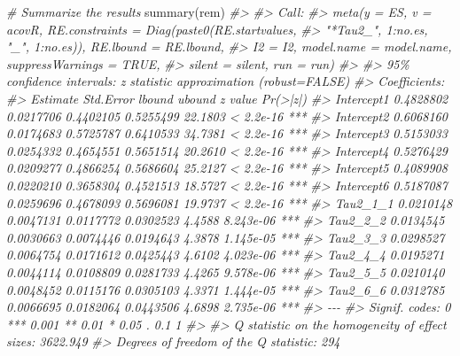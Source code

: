 \documentclass[
]{book}
\newenvironment{Shaded}{\begin{snugshade}}{\end{snugshade}}
\newcommand{\CommentTok}[1]{\textcolor[rgb]{0.56,0.35,0.01}{\textit{#1}}}
\newcommand{\FunctionTok}[1]{\textcolor[rgb]{0.00,0.00,0.00}{#1}}
\newcommand{\NormalTok}[1]{#1}
\begin{document}
\begin{Shaded}
\begin{Highlighting}[]
\CommentTok{\# Summarize the results}
\FunctionTok{summary}\NormalTok{(rem)}
\CommentTok{\#\textgreater{} }
\CommentTok{\#\textgreater{} Call:}
\CommentTok{\#\textgreater{} meta(y = ES, v = acovR, RE.constraints = Diag(paste0(RE.startvalues, }
\CommentTok{\#\textgreater{}     "*Tau2\_", 1:no.es, "\_", 1:no.es)), RE.lbound = RE.lbound, }
\CommentTok{\#\textgreater{}     I2 = I2, model.name = model.name, suppressWarnings = TRUE, }
\CommentTok{\#\textgreater{}     silent = silent, run = run)}
\CommentTok{\#\textgreater{} }
\CommentTok{\#\textgreater{} 95\% confidence intervals: z statistic approximation (robust=FALSE)}
\CommentTok{\#\textgreater{} Coefficients:}
\CommentTok{\#\textgreater{}             Estimate Std.Error    lbound    ubound z value  Pr(\textgreater{}|z|)    }
\CommentTok{\#\textgreater{} Intercept1 0.4828802 0.0217706 0.4402105 0.5255499 22.1803 \textless{} 2.2e{-}16 ***}
\CommentTok{\#\textgreater{} Intercept2 0.6068160 0.0174683 0.5725787 0.6410533 34.7381 \textless{} 2.2e{-}16 ***}
\CommentTok{\#\textgreater{} Intercept3 0.5153033 0.0254332 0.4654551 0.5651514 20.2610 \textless{} 2.2e{-}16 ***}
\CommentTok{\#\textgreater{} Intercept4 0.5276429 0.0209277 0.4866254 0.5686604 25.2127 \textless{} 2.2e{-}16 ***}
\CommentTok{\#\textgreater{} Intercept5 0.4089908 0.0220210 0.3658304 0.4521513 18.5727 \textless{} 2.2e{-}16 ***}
\CommentTok{\#\textgreater{} Intercept6 0.5187087 0.0259696 0.4678093 0.5696081 19.9737 \textless{} 2.2e{-}16 ***}
\CommentTok{\#\textgreater{} Tau2\_1\_1   0.0210148 0.0047131 0.0117772 0.0302523  4.4588 8.243e{-}06 ***}
\CommentTok{\#\textgreater{} Tau2\_2\_2   0.0134545 0.0030663 0.0074446 0.0194643  4.3878 1.145e{-}05 ***}
\CommentTok{\#\textgreater{} Tau2\_3\_3   0.0298527 0.0064754 0.0171612 0.0425443  4.6102 4.023e{-}06 ***}
\CommentTok{\#\textgreater{} Tau2\_4\_4   0.0195271 0.0044114 0.0108809 0.0281733  4.4265 9.578e{-}06 ***}
\CommentTok{\#\textgreater{} Tau2\_5\_5   0.0210140 0.0048452 0.0115176 0.0305103  4.3371 1.444e{-}05 ***}
\CommentTok{\#\textgreater{} Tau2\_6\_6   0.0312785 0.0066695 0.0182064 0.0443506  4.6898 2.735e{-}06 ***}
\CommentTok{\#\textgreater{} {-}{-}{-}}
\CommentTok{\#\textgreater{} Signif. codes:  0 \textquotesingle{}***\textquotesingle{} 0.001 \textquotesingle{}**\textquotesingle{} 0.01 \textquotesingle{}*\textquotesingle{} 0.05 \textquotesingle{}.\textquotesingle{} 0.1 \textquotesingle{} \textquotesingle{} 1}
\CommentTok{\#\textgreater{} }
\CommentTok{\#\textgreater{} Q statistic on the homogeneity of effect sizes: 3622.949}
\CommentTok{\#\textgreater{} Degrees of freedom of the Q statistic: 294}

\end{Highlighting}
\end{Shaded}
\end{document}
